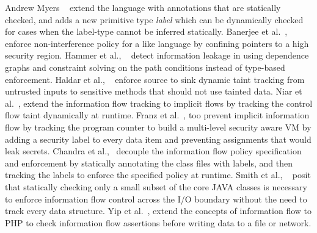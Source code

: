 Andrew Myers ~\citep{myers1999jflow} extend the \java{} language with annotations that are statically checked, and adds a new primitive type {\em label} which can be dynamically checked for cases when the label-type cannot be inferred statically.
Banerjee et  al.~\citep{banerjee2002secure}, enforce non-interference policy for a \java{} like language by confining pointers to a high security region.
Hammer et al., ~\citep{hammer2006information} detect information leakage in \java{} using dependence graphs and constraint solving on the path conditions instead of type-based enforcement.
Haldar et  al., ~\citep{haldar2005dynamic} enforce source to sink dynamic taint tracking from untrusted inputs to sensitive methods that should not use tainted data.
Niar et al.~\citep{nair2008virtual}, extend the information flow tracking to implicit flows by tracking the control flow taint dynamically at runtime. 
Franz et al.~\citep{franz2008eliminating}, too prevent implicit information flow by tracking the program counter to build a multi-level security aware \java{} VM by adding a security label to every data item and preventing assignments that would leak secrets.
Chandra et al.,~\citep{chandra2007fine} decouple the information flow policy specification and enforcement by statically annotating the \java{} class files with labels, and then tracking the labels to enforce the specified policy at runtime.
Smith et al., ~\citep{smith2007improving} posit that statically checking only a small subset of the core JAVA classes is necessary to enforce information flow control across the I/O boundary without the need to track every data structure. 
Yip et  al.~\citep{yip2009improving}, extend the concepts of information flow to PHP to check information flow assertions before writing data to a file or network.


